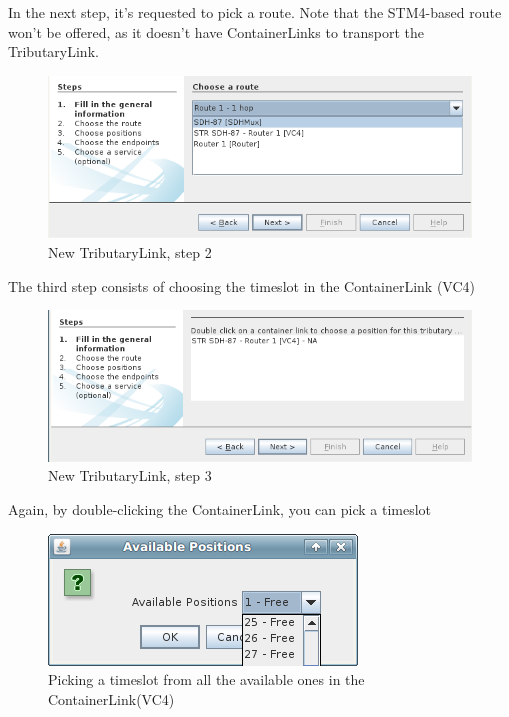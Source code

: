 \documentclass[a4paper]{article}
\begin{document}
		In the next step, it's requested to pick a route. Note that the STM4-based route won't be offered, as it doesn't have ContainerLinks to transport the TributaryLink.
		\begin{figure}[h!]
			\centering
			\includegraphics[width=\linewidth]{img/sdh_module_tributary_link_step_2.png}
			\caption{New TributaryLink, step 2}
			\label{fig:sdh_module_tributary_link_step_2}
		\end{figure}
		\newpage
		The third step consists of choosing the timeslot in the ContainerLink (VC4)
		\begin{figure}[h!]
			\centering
			\includegraphics[width=\linewidth]{img/sdh_module_tributary_link_step_3.png}
			\caption{New TributaryLink, step 3}
			\label{fig:sdh_module_tributary_link_step_3}
		\end{figure}

		Again, by double-clicking the ContainerLink, you can pick a timeslot
		\begin{figure}[h!]
			\centering
			\includegraphics[width=0.5\linewidth]{img/sdh_module_tributary_link_step_3_2.png}
			\caption{Picking a timeslot from all the available ones in the ContainerLink(VC4)}
			\label{fig:sdh_module_tributary_link_step_3_2}
		\end{figure}
		
\end{document}
